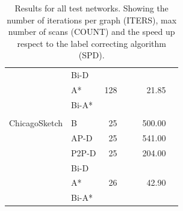\begin{table}[H]
\begin{tabular}{l l r rr rr }
                      & Bi-D  & & & & & \\
                      & A*    & 128 & & & 21.85 & \\
                      & Bi-A* & & & & & \\ \\
        ChicagoSketch & B     & 25 & & & 500.00 & \\
                      & AP-D  & 25 & & & 541.00 & \\
                      & P2P-D & 25 & & & 204.00 & \\
                      & Bi-D  & & & & & \\
                      & A*    & 26 & & & 42.90 & \\
                      & Bi-A* & & & & & \\
        \bottomrule
    \end{tabular}
    \caption{Results for all test networks. Showing the number of iterations per graph (ITERS), max number of scans (COUNT) and the speed up respect to the label correcting algorithm (SPD). }
    \label{table:allresult}
\end{table}

